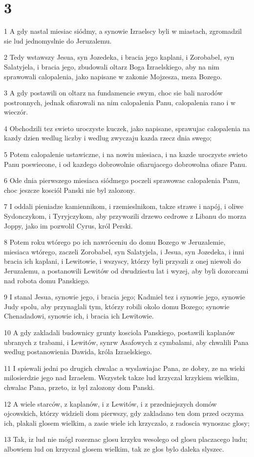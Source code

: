 \chapter{3}

\par 1 A gdy nastal miesiac siódmy, a synowie Izraelscy byli w miastach, zgromadzil sie lud jednomyslnie do Jeruzalemu.
\par 2 Tedy wstawszy Jesua, syn Jozedeka, i bracia jego kaplani, i Zorobabel, syn Salatyjela, i bracia jego, zbudowali oltarz Boga Izraelskiego, aby na nim sprawowali calopalenia, jako napisane w zakonie Mojzesza, meza Bozego.
\par 3 A gdy postawili on oltarz na fundamencie swym, choc sie bali narodów postronnych, jednak ofiarowali na nim calopalenia Panu, calopalenia rano i w wieczór.
\par 4 Obchodzili tez swieto uroczyste kuczek, jako napisane, sprawujac calopalenia na kazdy dzien wedlug liczby i wedlug zwyczaju kazda rzecz dnia swego;
\par 5 Potem calopalenie ustawiczne, i na nowiu miesiaca, i na kazde uroczyste swieto Panu poswiecone, i od kazdego dobrowolnie ofiarujacego dobrowolna ofiare Panu.
\par 6 Ode dnia pierwszego miesiaca siódmego poczeli sprawowac calopalenia Panu, choc jeszcze kosciól Panski nie byl zalozony.
\par 7 I oddali pieniadze kamiennikom, i rzemieslnikom, takze strawe i napój, i oliwe Sydonczykom, i Tyryjczykom, aby przywozili drzewo cedrowe z Libanu do morza Joppy, jako im pozwolil Cyrus, król Perski.
\par 8 Potem roku wtórego po ich nawróceniu do domu Bozego w Jeruzalemie, miesiaca wtórego, zaczeli Zorobabel, syn Salatyjela, i Jesua, syn Jozedeka, i inni bracia ich kaplani, i Lewitowie, i wszyscy, którzy byli przyszli z onej niewoli do Jeruzalemu, a postanowili Lewitów od dwudziestu lat i wyzej, aby byli dozorcami nad robota domu Panskiego.
\par 9 I stanal Jesua, synowie jego, i bracia jego; Kadmiel tez i synowie jego, synowie Judy spolu, aby przynaglali tym, którzy robili okolo domu Bozego; synowie Chenadadowi, synowie ich, i bracia ich Lewitowie.
\par 10 A gdy zakladali budownicy grunty kosciola Panskiego, postawili kaplanów ubranych z trabami, i Lewitów, synrw Asafowych z cymbalami, aby chwalili Pana wedlug postanowienia Dawida, króla Izraelskiego.
\par 11 I spiewali jedni po drugich chwalac a wyslawiajac Pana, ze dobry, ze na wieki milosierdzie jego nad Izraelem. Wszystek takze lud krzyczal krzykiem wielkim, chwalac Pana, przeto, iz byl zalozony dom Panski.
\par 12 A wiele starców, z kaplanów, i z Lewitów, i z przedniejszych domów ojcowskich, którzy widzieli dom pierwszy, gdy zakladano ten dom przed oczyma ich, plakali glosem wielkim, a zasie wiele ich krzyczalo, z radoscia wynoszac glosy;
\par 13 Tak, iz lud nie mógl rozeznac glosu krzyku wesolego od glosu placzacego ludu; albowiem lud on krzyczal glosem wielkim, tak ze glos bylo daleka slyszec.

